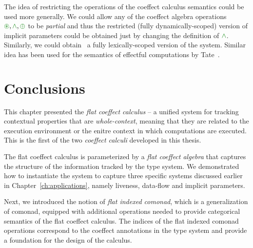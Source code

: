 The idea of restricting the operations of the coeffect calculus semantics could be used more
generally. We could allow any of the coeffect algebra operations $\cseq, \czip, \cpar$ to be
\emph{partial} and thus the restricted (fully dynamically-scoped) version of implicit parameters
could be obtained just by changing the definition of $\czip$. Similarly, we could obtain \eg~a
fully lexically-scoped version of the system. Similar idea has been used for the
semantics of effectful computations by Tate~\cite{effects-producer-semantics}.

%                                                                             
%                                                                             
\section{Conclusions}

This chapter presented the \emph{flat coeffect calculus} -- a unified system for tracking 
contextual properties that are \emph{whole-context}, meaning that they are related to the 
execution environment or the enitre context in which computations are executed.
This is the first of the two \emph{coeffect calculi} developed in this thesis.

The flat coeffect calculus is parameterized by a \emph{flat coeffect algebra} that captures
the structure of the information tracked by the type system. We demonstrated how to 
instantiate the system to capture three specific systems discussed earlier in 
Chapter~\ref{ch:applications}, namely liveness, data-flow and implicit parameters.

Next, we introduced the notion of \emph{flat indexed comonad}, which is a generalization of
comonad, equipped with additional operations needed to provide categorical semantics of the 
flat coeffect calculus. The indices of the flat indexed comonad operations correspond to the
coeffect annotations in the type system and provide a foundation for the design of the 
calculus. 

